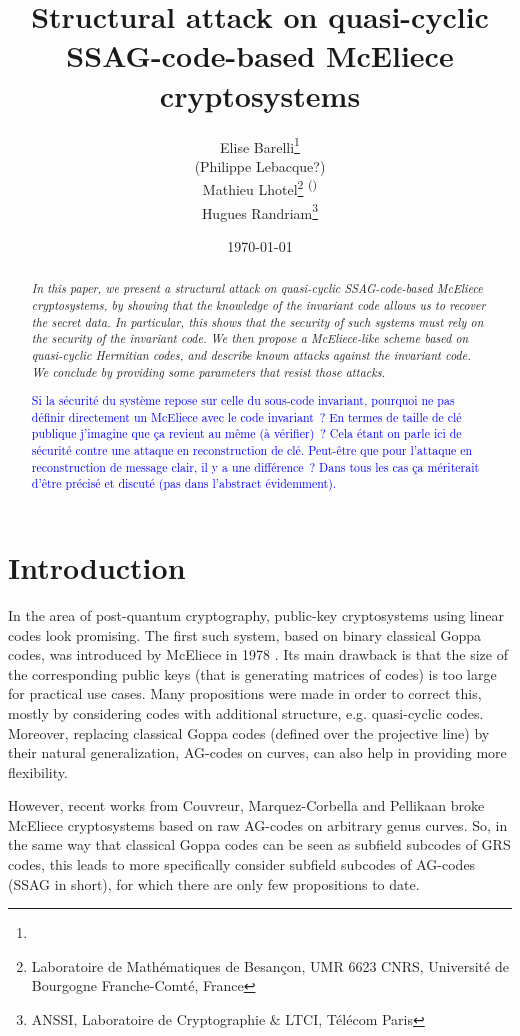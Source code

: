 \documentclass[10pt]{article}
\title{Structural attack on quasi-cyclic SSAG-code-based McEliece cryptosystems}
\author{
Elise Barelli\footnote{}\\
(Philippe Lebacque?)\\
Mathieu Lhotel\footnote{Laboratoire de Mathématiques de Besançon, UMR 6623 CNRS, Université de Bourgogne Franche-Comté, France} \textsuperscript{(\Letter)}\\
Hugues Randriam\footnote{ANSSI, Laboratoire de Cryptographie \& LTCI, Télécom Paris}
}
\date{\today}
\newcommand{\s}{\vspace{0.3cm}}
\newcommand{\hugues}[1]{\textcolor{blue}{#1}}
\begin{document}
\maketitle

\begin{abstract} 
\it In this paper, we present a structural attack on quasi-cyclic SSAG-code-based McEliece cryptosystems, by showing that the knowledge of the invariant code allows us to recover the secret data. In particular, this shows that the security of such systems must rely on the security of the invariant code. We then propose a McEliece-like scheme based on quasi-cyclic Hermitian codes, and describe known attacks against the invariant code. We conclude by providing some parameters that resist those attacks.

\hugues{
Si la sécurité du système repose sur celle du sous-code invariant, pourquoi ne pas définir directement un McEliece avec le code invariant~?
En termes de taille de clé publique j'imagine que ça revient au même (à vérifier)~?
Cela étant on parle ici de sécurité contre une attaque en reconstruction de clé.
Peut-être que pour l'attaque en reconstruction de message clair, il y a une différence~?
Dans tous les cas ça mériterait d'être précisé et discuté (pas dans l'abstract évidemment).
}
\end{abstract}

\newpage



\section{Introduction}

\s
In the area of post-quantum cryptography, public-key cryptosystems using linear codes look promising. The first such system, based on binary classical Goppa codes, was introduced by McEliece in 1978 \cite{McE}. Its main drawback is that the size of the corresponding public keys (that is generating matrices of codes) is too large for practical use cases. Many propositions were made in order to correct this, mostly by considering codes with additional structure, e.g. quasi-cyclic codes. Moreover, replacing classical Goppa codes (defined over the projective line) by their natural generalization, AG-codes on curves, can also help in providing more flexibility. 

\s

However, recent works from Couvreur, Marquez-Corbella and Pellikaan \cite{CMP} broke McEliece cryptosystems based on raw AG-codes on arbitrary genus curves. So, in the same way that classical Goppa codes can be seen as subfield subcodes of GRS codes, this leads to more specifically consider subfield subcodes of AG-codes (SSAG in short), for which there are only few propositions to date.
\end{document}
